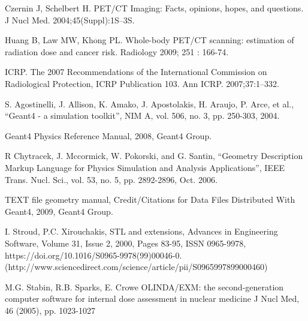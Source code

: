 \documentclass[letterpaper,12pt]{article}
\begin{document}
\begin{thebibliography}{99}



 Czernin J, Schelbert H. PET/CT Imaging: Facts, opinions, hopes, and questions. J Nucl Med. 2004;45(Suppl):1S–3S.

 Huang B, Law MW, Khong PL. Whole-body PET/CT scanning: estimation of radiation dose and cancer risk. Radiology 2009; 251 : 166-74.

 ICRP. The 2007 Recommendations of the International Commission on Radiological Protection, ICRP Publication 103. Ann ICRP. 2007;37:1–332.



 S. Agostinelli, J. Allison, K. Amako, J. Apostolakis, H. Araujo, P. Arce, et al., “Geant4 - a simulation toolkit”, NIM A, vol. 506, no. 3, pp. 250-303, 2004.



 Geant4 Physics Reference Manual, 2008, Geant4 Group.


 R Chytracek, J. Mccormick, W. Pokorski, and G. Santin, “Geometry Description Markup Language for Physics Simulation and Analysis Applications”, IEEE Trans. Nucl. Sci., vol. 53, no. 5, pp. 2892-2896, Oct. 2006.

 TEXT file geometry manual, Credit/Citations for Data Files Distributed With Geant4, 2009, Geant4 Group.

 I. Stroud, P.C. Xirouchakis, STL and extensions, Advances in Engineering Software, Volume 31, Issue 2, 2000, Pages 83-95, ISSN 0965-9978, https://doi.org/10.1016/S0965-9978(99)00046-0. (http://www.sciencedirect.com/science/article/pii/S0965997899000460)

 M.G. Stabin, R.B. Sparks, E. Crowe OLINDA/EXM: the second-generation computer software for internal dose assessment in nuclear medicine J Nucl Med, 46 (2005), pp. 1023-1027


\end{thebibliography}
\end{document}

